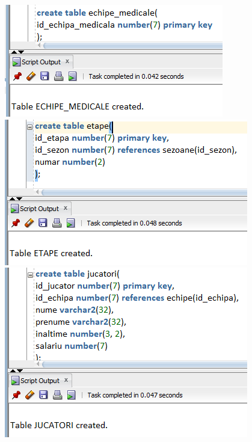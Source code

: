 \documentclass{article}
\begin{document}
\begin{multicols*}{4}
\vspace{4em}
\includegraphics[width=\linewidth]{creation/echipe_medicale}
\vspace{4em}
\includegraphics[width=\linewidth]{creation/etape}
\vspace{4em}
\includegraphics[width=\linewidth]{creation/jucatori}

\end{multicols*}
\end{document}
